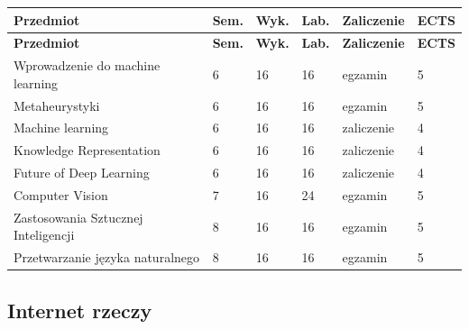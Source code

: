 \documentclass[12pt,a4paper]{article}
\newcommand{\thdrule}{\noalign{\global\setlength{\extrarowheight}{0pt}}}
\newcommand{\thdend}{\noalign{\global\setlength{\extrarowheight}{4pt}}}
\begin{document}
{\scriptsize
\begin{longtable}{m{6.5cm}m{0.7cm}m{1cm}m{1cm}m{1.7cm}m{0.7cm}}
\thdrule\toprule
\rowcolor{pjatkRed}
{\color{white}\footnotesize\textbf{\vphantom{Ag}Przedmiot}} & {\color{white}\footnotesize\textbf{\vphantom{Ag}Sem.}} & {\color{white}\footnotesize\textbf{\vphantom{Ag}Wyk.}} & {\color{white}\footnotesize\textbf{\vphantom{Ag}Lab.}} & {\color{white}\footnotesize\textbf{\vphantom{Ag}Zaliczenie}} & {\color{white}\footnotesize\textbf{\vphantom{Ag}ECTS}} \\
\midrule\thdend
\endfirsthead
\thdrule\toprule
\rowcolor{pjatkRed}
{\color{white}\footnotesize\textbf{\vphantom{Ag}Przedmiot}} & {\color{white}\footnotesize\textbf{\vphantom{Ag}Sem.}} & {\color{white}\footnotesize\textbf{\vphantom{Ag}Wyk.}} & {\color{white}\footnotesize\textbf{\vphantom{Ag}Lab.}} & {\color{white}\footnotesize\textbf{\vphantom{Ag}Zaliczenie}} & {\color{white}\footnotesize\textbf{\vphantom{Ag}ECTS}} \\
\midrule\thdend
\endhead
\rowcolor{tableRowLight} Wprowadzenie do machine learning & 6 & 16 & 16 & {\scriptsize egzamin} & 5 \\
\rowcolor{tableRowAlt} Metaheurystyki & 6 & 16 & 16 & {\scriptsize egzamin} & 5 \\
\rowcolor{tableRowLight} Machine learning & 6 & 16 & 16 & {\scriptsize zaliczenie} & 4 \\
\rowcolor{tableRowAlt} Knowledge Representation & 6 & 16 & 16 & {\scriptsize zaliczenie} & 4 \\
\rowcolor{tableRowLight} Future of Deep Learning & 6 & 16 & 16 & {\scriptsize zaliczenie} & 4 \\
\rowcolor{tableRowAlt} Computer Vision & 7 & 16 & 24 & {\scriptsize egzamin} & 5 \\
\rowcolor{tableRowLight} Zastosowania Sztucznej Inteligencji & 8 & 16 & 16 & {\scriptsize egzamin} & 5 \\
\rowcolor{tableRowAlt} Przetwarzanie języka naturalnego & 8 & 16 & 16 & {\scriptsize egzamin} & 5 \\
\bottomrule
\end{longtable}}

\subsection*{Internet rzeczy}
\end{document}
